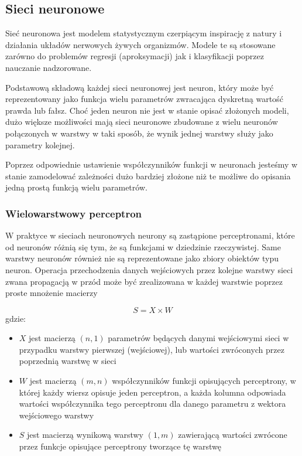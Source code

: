 \documentclass{article}
\begin{document}
\subsection{Sieci neuronowe}
Sieć neuronowa jest modelem statystycznym czerpiącym inspirację z natury i 
działania układów nerwowych żywych organizmów.
Modele te są stosowane zarówno do problemów regresji (aproksymacji) jak i klasyfikacji 
poprzez nauczanie nadzorowane.

Podstawową składową każdej sieci neuronowej jest neuron, który może być reprezentowany 
jako funkcja wielu parametrów zwracająca dyskretną wartość
prawda lub fałsz. Choć jeden neuron nie jest w stanie opisać złożonych modeli, 
dużo większe możliwości mają sieci neuronowe zbudowane z wielu neuronów
połączonych w warstwy w taki sposób, że wynik jednej warstwy służy jako parametry kolejnej.


Poprzez odpowiednie ustawienie współczynników funkcji w neuronach jesteśmy w 
stanie zamodelować zależności dużo bardziej złożone niż te możliwe do opisania jedną
prostą funkcją wielu parametrów.

\subsubsection{Wielowarstwowy perceptron}

W praktyce w sieciach neuronowych neurony są zastąpione perceptronami, które od neuronów 
różnią się tym, że są funkcjami w dziedzinie rzeczywistej.
Same warstwy neuronów również nie są reprezentowane jako zbiory obiektów typu neuron. 
Operacja przechodzenia danych wejściowych przez kolejne warstwy sieci
zwana propagacją w przód może być zrealizowana w każdej warstwie poprzez proste mnożenie macierzy

\begin {equation}
    S = X \times W
\end{equation}
gdzie:
\begin{itemize}
    \item $X$ jest macierzą $(n, 1)$ parametrów będących danymi 
    wejściowymi sieci w przypadku warstwy pierwszej (wejściowej), 
    lub wartości zwróconych przez poprzednią warstwę w sieci
    \item $W$ jest macierzą $(m, n)$ współczynników funkcji opisujących perceptrony, 
    w której każdy wiersz opisuje jeden perceptron, 
    a każda kolumna odpowiada wartości współczynnika tego perceptronu dla danego parametru 
    z wektora wejściowego warstwy
    \item $S$ jest macierzą wynikową warstwy $(1, m)$ zawierającą wartości zwrócone przez 
    funkcje opisujące perceptrony tworzące tę warstwę
\end{itemize}
\end{document}
